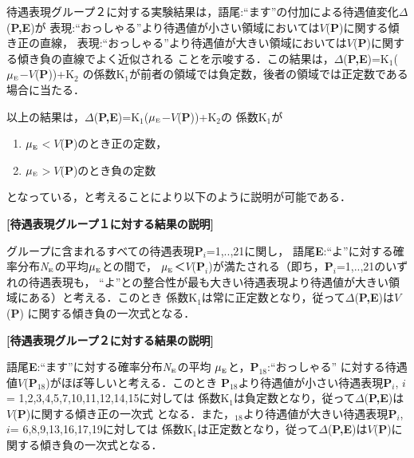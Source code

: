 待遇表現グループ２に対する実験結果は，語尾:``ます''の付加による待遇値変化\hspace{-0.25mm}\(\Delta\)({\bf P,E})が
表現:``おっしゃる''より待遇値が小さい領域においては\(V\)({\bf P})に関する傾き正の直線，
表現:``おっしゃる''\hspace{1.5mm}より待遇値が大きい領域においては\hspace{0.8mm}\(V\)({\bf P})\hspace{0.8mm}に関する傾き負の直線でよく近似される
ことを示唆する．この結果は，\hspace{-0.2mm}\(\Delta\)({\bf P,E})=K\(_{1}\)(\(\mu_{\mbox{\tiny{E}}}\)−\(V\)({\bf P}))+K\(_{2}\)\hspace{-0.2mm}
の係数\hspace{-0.2mm}K\(_{1}\)\hspace{-0.2mm}が前者の領域では負定数，後者の領域では正定数である場合に当たる．

以上の結果は，\(\Delta\)({\bf P,E})=K\(_{1}\)(\(\mu_{\mbox{\tiny{E}}}\)−\(V\)({\bf P}))+K\(_{2}\)の
係数K\(_{1}\)が
\begin{enumerate}
\item \(\mu_{\mbox{\tiny{E}}}\)\(<\)\(V\)({\bf P})のとき正の定数，
\item \(\mu_{\mbox{\tiny{E}}}\)\(>\)\(V\)({\bf P})のとき負の定数
\end{enumerate}
となっている，と考えることにより以下のように説明が可能である．

{\flushleft \bf [待遇表現グループ１に対する結果の説明]}　

グループに含まれるすべての待遇表現{\bf P}\(_{i}\)=1,..,21に関し，
語尾{\bf E}:``よ''に対する確率分布{\em N}\(_{\mbox{\tiny{E}}}\)の平均\hspace{-0.12mm}\(\mu_{\mbox{\tiny{E}}}\)\hspace{-0.12mm}との間で，
\(\mu_{\mbox{\tiny{E}}}\)＜\(V\)({\bf P}\(_{i}\))が満たされる（即ち，{\bf P}\(_{i}\)=1,..,21のいずれの待遇表現も，
``よ''との整合性が最も大きい待遇表現より待遇値が大きい領域にある）と考える．このとき
係数K\(_{1}\)は常に正定数となり，従って\(\Delta\)({\bf P,E})は\(V\)({\bf P})
に関する傾き負の一次式となる．

{\flushleft \bf [待遇表現グループ２に対する結果の説明]}

語尾{\bf E}:``ます''に対する確率分布{\em N}\(_{\mbox{\tiny{E}}}\)の平均
\(\mu_{\mbox{\tiny{E}}}\)と，{\bf P}\(_{18}\):``おっしゃる''
に対する待遇値\(V\)({\bf P}\(_{18}\))がほぼ等しいと考える．このとき
{\bf P}\(_{18}\)より待遇値が小さい待遇表現{\bf P}\(_{i}\), \(i\)= 1,2,3,4,5,7,10,11,12,14,15に対しては
係数K\(_{1}\)は負定数となり，従って\(\Delta\)({\bf P,E})は\(V\)({\bf P})に関する傾き正の一次式
となる．また，\hspace{-0.12mm}{\bf P}\(_{18}\)\hspace{-0.12mm}より待遇値が大きい待遇表現{\bf P}\(_{i}\), \(i\)= 6,8,9,13,16,17,19に対しては
係数K\(_{1}\)は正定数となり，従って\(\Delta\)({\bf P,E})は\(V\)({\bf P})に関する傾き負の一次式となる．

